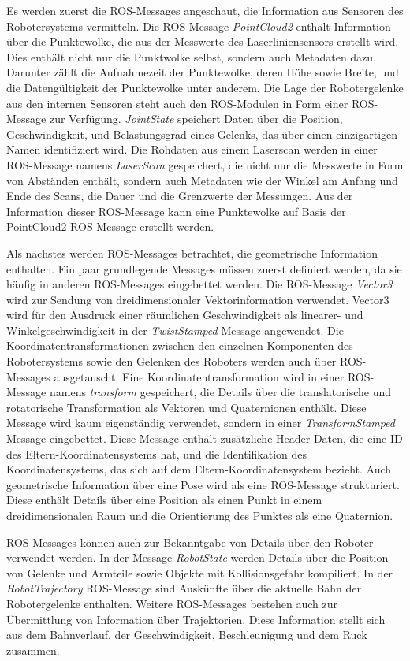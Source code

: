 Es werden zuerst die ROS-Messages angeschaut, die Information aus Sensoren des Robotersystems vermitteln. Die ROS-Message \emph{PointCloud2} enthält Information über die Punktewolke, die aus der Messwerte des Laserliniensensors erstellt wird. Dies enthält nicht nur die Punktwolke selbst, sondern auch Metadaten dazu. Darunter zählt die Aufnahmezeit der Punktewolke, deren Höhe sowie Breite, und die Datengültigkeit der Punktewolke unter anderem. Die Lage der Robotergelenke aus den internen Sensoren steht auch den ROS-Modulen in Form einer ROS-Message zur Verfügung. \emph{JointState} speichert Daten über die Position, Geschwindigkeit, und Belastungsgrad eines Gelenks, das über einen einzigartigen Namen identifiziert wird. Die Rohdaten aus einem Laserscan werden in einer ROS-Message namens \emph{LaserScan} gespeichert, die nicht nur die Messwerte in Form von Abständen enthält, sondern auch Metadaten wie der Winkel am Anfang und Ende des Scans, die Dauer und die Grenzwerte der Messungen. Aus der Information dieser ROS-Message kann eine Punktewolke auf Basis der PointCloud2 ROS-Message erstellt werden.

Als nächstes werden ROS-Messages betrachtet, die geometrische Information enthalten. Ein paar grundlegende Messages müssen zuerst definiert werden, da sie häufig in anderen ROS-Messages eingebettet werden. Die ROS-Message \emph{Vector3} wird zur Sendung von dreidimensionaler Vektorinformation verwendet. Vector3 wird für den Ausdruck einer räumlichen Geschwindigkeit als linearer- und Winkelgeschwindigkeit in der \emph{TwistStamped} Message angewendet. Die Koordinatentransformationen zwischen den einzelnen Komponenten des Robotersystems sowie den Gelenken des Roboters werden auch über ROS-Messages ausgetauscht. Eine Koordinatentransformation wird in einer ROS-Message namens \emph{transform} gespeichert, die Details über die translatorische und rotatorische Transformation als Vektoren und Quaternionen enthält. Diese Message wird kaum eigenständig verwendet, sondern in einer \emph{TransformStamped} Message eingebettet. Diese Message enthält zusätzliche Header-Daten, die eine ID des Eltern-Koordinatensystems hat, und die Identifikation des Koordinatensystems, das sich auf dem Eltern-Koordinatensystem bezieht. Auch geometrische Information über eine Pose wird als eine ROS-Message strukturiert. Diese enthält Details über eine Position als einen Punkt in einem dreidimensionalen Raum und die Orientierung des Punktes als eine Quaternion. 

ROS-Messages können auch zur Bekanntgabe von Details über den Roboter verwendet werden. In der Message \emph{RobotState} werden Details über die Position von Gelenke und Armteile sowie Objekte mit Kollisionsgefahr kompiliert. In der \emph{RobotTrajectory} ROS-Message sind Auskünfte über die aktuelle Bahn der Robotergelenke enthalten. Weitere ROS-Messages bestehen auch zur Übermittlung von Information über Trajektorien. Diese Information stellt sich aus dem Bahnverlauf, der Geschwindigkeit, Beschleunigung und dem Ruck zusammen. 

